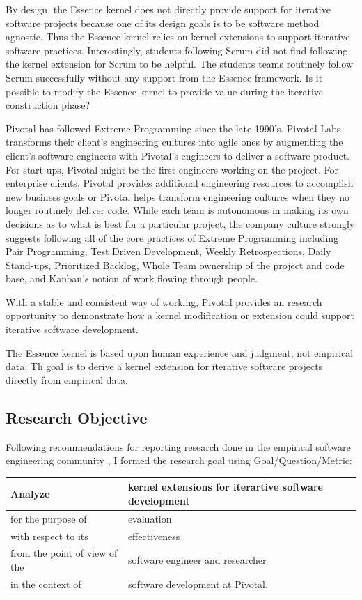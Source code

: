 \documentclass[preprint,12pt,3p]{elsarticle}
\begin{document}
By design, the Essence kernel does not directly provide support for iterative software projects because one of its design goals is to be software method agnostic.\cite{ICSE2014} Thus the Essence kernel relies on kernel extensions to support iterative software practices. Interestingly, students following Scrum did not find following the kernel extension for Scrum to be helpful. The students teams routinely follow Scrum successfully without any support from the Essence framework. Is it possible to modify the Essence kernel to provide value during the iterative construction phase? 

Pivotal has followed Extreme Programming \cite{ExtremeProgrammingExplained} since the late 1990's. Pivotal Labs transforms their client's engineering cultures into agile ones by augmenting the client's software engineers with Pivotal's engineers to deliver a software product. For start-ups, Pivotal might be the first engineers working on the project. For enterprise clients, Pivotal provides additional engineering resources to accomplish new business goals or Pivotal helps transform engineering cultures when they no longer routinely deliver code.  While each team is autonomous in making its own decisions as to what is best for a particular project, the company culture strongly suggests following all of the core practices of Extreme Programming including Pair Programming, Test Driven Development, Weekly Retrospections, Daily Stand-ups, Prioritized Backlog, Whole Team ownership of the project and code base, and Kanban's notion of work flowing through people. 

With a stable and consistent way of working, Pivotal provides an research opportunity to demonstrate how a kernel modification or extension could support iterative software development. 

The Essence kernel is based upon human experience and judgment, not empirical data. Th goal is to derive a kernel extension for iterative software projects directly from empirical data. 

\subsection{Research Objective}
Following recommendations for reporting research done in the empirical
software engineering community
\cite{GQM, Shaw}, I formed the
research goal using Goal/Question/Metric:
\cite{GQM}

\begin{table}[h]
\centering
\begin{tabular}{|p{2.00in}|p{4.10in}|}
\hline
Analyze & kernel extensions for iterartive software development \\ \hline
for the purpose of & evaluation \\ \hline
with respect to its & effectiveness \\ \hline
from the point of view of the & software engineer and researcher \\ \hline
in the context of & software development at Pivotal. \\
\hline
\end{tabular}
\end{table}
\end{document}
